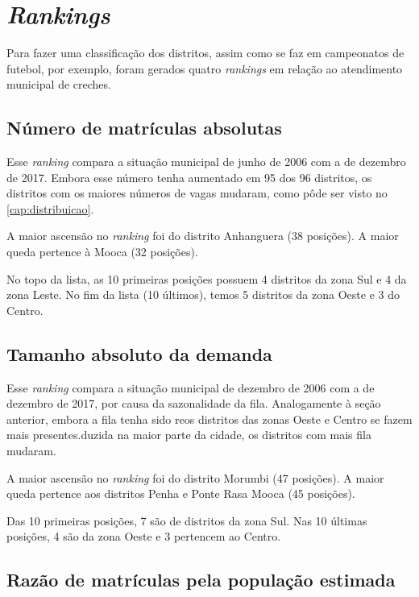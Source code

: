 \chapter{\textit{Rankings}}
\label{cap:rankings}

Para fazer uma classificação dos distritos, assim como se faz em campeonatos de futebol, por exemplo, foram gerados quatro \textit{rankings} em relação ao atendimento municipal de creches.

\section{Número de matrículas absolutas}

Esse \textit{ranking} compara a situação municipal de junho de 2006 com a de dezembro de 2017. Embora esse número tenha aumentado em 95 dos 96 distritos, os distritos com os maiores números de vagas mudaram, como pôde ser visto no \autoref{cap:distribuicao}.

A maior ascensão no \textit{ranking} foi do distrito Anhanguera (38 posições). A maior queda pertence à Mooca (32 posições).

No topo da lista, as 10 primeiras posições possuem 4 distritos da zona Sul e 4 da zona Leste. No fim da lista (10 últimos), temos 5 distritos da zona Oeste e 3 do Centro.

\section{Tamanho absoluto da demanda}

Esse \textit{ranking} compara a situação municipal de dezembro de 2006 com a de dezembro de 2017, por causa da sazonalidade da fila. Analogamente à seção anterior, embora a fila tenha sido reos distritos das zonas Oeste e Centro se fazem mais presentes.duzida na maior parte da cidade, os distritos com mais fila mudaram.

A maior ascensão no \textit{ranking} foi do distrito Morumbi (47 posições). A maior queda pertence aos distritos Penha e Ponte Rasa Mooca (45 posições).

Das 10 primeiras posições, 7 são de distritos da zona Sul. Nas 10 últimas posições, 4 são da zona Oeste e 3 pertencem ao Centro.

\section{Razão de matrículas pela população estimada}

